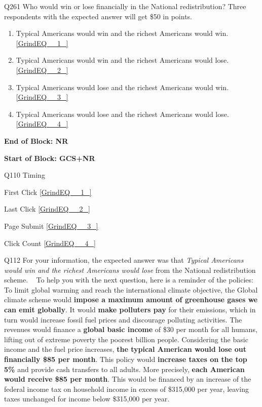 \documentclass{article} %
\begin{document}
\noindent 

\noindent 

\noindent 

\noindent Q261 Who would win or lose financially in the National redistribution? Three respondents with the expected answer will get \$50 in points.

\begin{enumerate}
\item  Typical Americans would win and the richest Americans would win.  \eqref{GrindEQ__1_} 

\item  Typical Americans would win and the richest Americans would lose.  \eqref{GrindEQ__2_} 

\item  Typical Americans would lose and the richest Americans would win.  \eqref{GrindEQ__3_} 

\item  Typical Americans would lose and the richest Americans would lose.  \eqref{GrindEQ__4_} 
\end{enumerate}

\noindent 

\noindent \textbf{End of Block: NR}

\noindent \textbf{}

\noindent \textbf{Start of Block: GCS+NR}

\noindent 

\noindent Q110 Timing

\noindent First Click  \eqref{GrindEQ__1_}

\noindent Last Click  \eqref{GrindEQ__2_}

\noindent Page Submit  \eqref{GrindEQ__3_}

\noindent Click Count  \eqref{GrindEQ__4_}

\noindent 

\noindent 

\noindent 

\noindent Q112 For your information, the expected answer was that \textit{Typical Americans would win and the richest Americans would lose} from the National redistribution scheme.  ~  To help you with the next question, here is a reminder of the policies:  \textbf{}~  To limit global warming and reach the international climate objective, the Global climate scheme would \textbf{impose a maximum amount of greenhouse gases we can emit globally}.  It would \textbf{make polluters pay} for their emissions, which in turn would increase fossil fuel prices and discourage polluting activities.  The revenues would finance a \textbf{global basic income} of \$30 per month for all humans, lifting out of extreme poverty the poorest billion people.  Considering the basic income and the fuel price increases, \textbf{the typical American would lose out financially \$85 per month}.  \textbf{} This policy would \textbf{increase taxes on the top 5\%} and provide cash transfers to all adults. More precisely, \textbf{each American would receive \$85 per month}. This would be financed by an increase of the federal income tax on household income in excess of \$315,000 per year, leaving taxes unchanged for income below \$315,000 per year.
\end{document}
